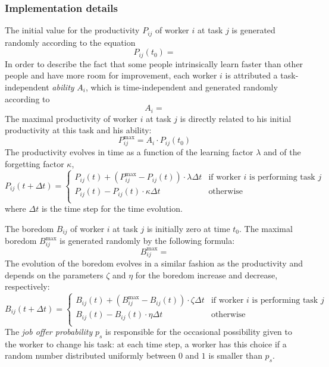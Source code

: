 \subsubsection{Implementation details}
The initial value for the productivity $P_{ij}$ of worker $i$ at task $j$ is generated randomly according to the equation
\begin{equation}
	P_{ij}(t_0) = 
\end{equation}
In order to describe the fact that some people intrinsically learn faster than other people and have more room for improvement, each worker $i$ is attributed a task-independent \emph{ability} $A_i$, which is time-independent and generated randomly according to
\begin{equation}
	A_{i} = 
\end{equation}
The maximal productivity of worker $i$ at task $j$ is directly related to his initial productivity at this task and his ability:
\begin{equation}
	P_{ij}^\textrm{max} = A_i \cdot P_{ij}(t_0)
\end{equation}
The productivity evolves in time as a function of the learning factor $\lambda$ and of the forgetting factor $\kappa$, 
\begin{equation}
	P_{ij}(t+\Delta t) = \begin{cases}
		P_{ij}(t) + (P_{ij}^\textrm{max}-P_{ij}(t)) \cdot \lambda \Delta t & \text{if worker $i$ is performing task $j$}\\
		P_{ij}(t) - P_{ij}(t) \cdot \kappa \Delta t & \text{otherwise}\\
		\end{cases}
\end{equation}
where $\Delta t$ is the time step for the time evolution.

The boredom $B_{ij}$ of worker $i$ at task $j$ is initially zero at time $t_0$. The maximal boredom $B_{ij}^\textrm{max}$ is generated randomly by the following formula:
\begin{equation}
	B_{ij}^\textrm{max} = 
\end{equation}
The evolution of the boredom evolves in a similar fashion as the productivity and depends on the parameters $\zeta$ and $\eta$ for the boredom increase and decrease, respectively:
\begin{equation}
	B_{ij}(t+\Delta t) = \begin{cases}
		B_{ij}(t) + (B_{ij}^\textrm{max}-B_{ij}(t)) \cdot \zeta \Delta t & \text{if worker $i$ is performing task $j$}\\
		B_{ij}(t) - B_{ij}(t) \cdot \eta \Delta t & \text{otherwise}\\
		\end{cases}
\end{equation}
The \emph{job offer probability} $p_s$ is responsible for the occasional possibility given to the worker to change his task: at each time step, a worker has this choice if a random number distributed uniformly between $0$ and $1$ is smaller than $p_s$.
